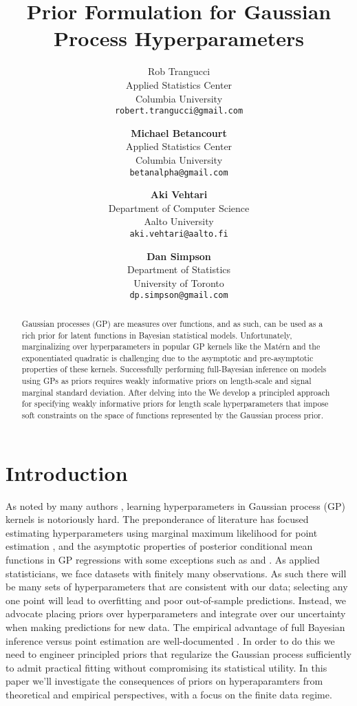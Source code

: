 \documentclass{article}
\title{Prior Formulation for Gaussian Process Hyperparameters}
\author{
  Rob Trangucci \\
  Applied Statistics Center\\
  Columbia University\\
  \texttt{robert.trangucci@gmail.com} 
  \and
  \textbf{Michael Betancourt} \\
  Applied Statistics Center \\
  Columbia University \\
  \texttt{betanalpha@gmail.com} 
  \and
  \textbf{Aki Vehtari} \\
  Department of Computer Science \\
  Aalto University \\
  \texttt{aki.vehtari@aalto.fi} 
  \and
  \textbf{Dan Simpson} \\
  Department of Statistics \\
  University of Toronto \\
  \texttt{dp.simpson@gmail.com} 
}
\begin{document}

\maketitle

\begin{abstract}
  Gaussian processes (GP) are measures over functions, and as such, can be used
  as a rich prior for latent functions in Bayesian statistical models.
  Unfortunately, marginalizing over hyperparameters in popular GP kernels like
  the Mat\'{e}rn and the exponentiated quadratic is challenging due to the
  asymptotic and pre-asymptotic properties of these kernels. Successfully
  performing full-Bayesian inference on models using GPs as priors requires
  weakly informative priors on length-scale and signal marginal standard
  deviation. After delving into the We develop a principled approach for
  specifying weakly informative priors for length scale hyperparameters that
  impose soft constraints on the space of functions represented by the Gaussian
  process prior.
\end{abstract}


\section{Introduction}

As noted by many authors \citep{flaxman2015fast,stein2012interpolation,rasmussen2005gaussian,fuglstad2015interpretable}, learning hyperparameters in Gaussian
process (GP) kernels is notoriously hard. The preponderance of literature has
focused estimating hyperparameters using marginal maximum likelihood for point
estimation \citep{stein2012interpolation,rasmussen2005gaussian,warnes1987problems}, and the asymptotic properties of posterior
conditional mean functions in GP regressions \citep{seeger2008information,
stein2012interpolation,rasmussen2005gaussian,williams2000upper} with some exceptions such as
\citet{neal1998regression} and \citet{vanhatalo2013gpstuff}. As applied
statisticians, we face datasets with finitely many observations. As such there
will be many sets of hyperparameters that are consistent with our data;
selecting any one point will lead to overfitting and poor out-of-sample
predictions. Instead, we advocate placing priors over hyperparameters and
integrate over our uncertainty when making predictions for new data. The
empirical advantage of full Bayesian inference versus point estimation are
well-documented \citep[e.g.][]{Vanhatalo+Pietilainen+Vehtari:2010,vehtariloo}. In order to do this we need to engineer
principled priors that regularize the Gaussian process sufficiently to admit
practical fitting without compromising its statistical utility. In this paper
we'll investigate the consequences of priors on hyperaparamters from
theoretical and empirical perspectives, with a focus on the finite data regime.
\end{document}
